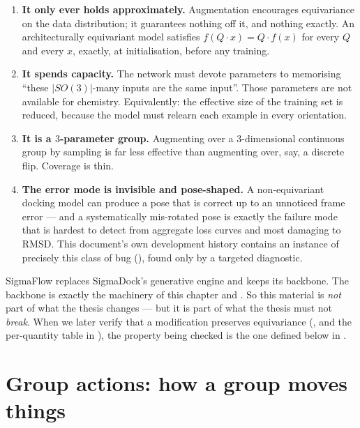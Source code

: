 \documentclass[11pt,a4paper]{report}
\theoremstyle{definition}
\theoremstyle{remark}
\begin{document}
\begin{enumerate}
\item \textbf{It only ever holds approximately.} Augmentation encourages
equivariance on the data distribution; it guarantees nothing off it, and
nothing exactly. An architecturally equivariant model satisfies
$f(Q\cdot x)=Q\cdot f(x)$ for every $Q$ and every $x$, exactly, at
initialisation, before any training.
\item \textbf{It spends capacity.} The network must devote parameters to
memorising ``these $|SO(3)|$-many inputs are the same input''. Those
parameters are not available for chemistry. Equivalently: the effective
size of the training set is reduced, because the model must relearn each
example in every orientation.
\item \textbf{It is a $3$-parameter group.} Augmenting over a
$3$-dimensional continuous group by sampling is far less effective than
augmenting over, say, a discrete flip. Coverage is thin.
\item \textbf{The error mode is invisible and pose-shaped.} A
non-equivariant docking model can produce a pose that is correct up to an
unnoticed frame error --- and a systematically mis-rotated pose is exactly
the failure mode that is hardest to detect from aggregate loss curves and
most damaging to RMSD. This document's own development history contains an
instance of precisely this class of bug (),
found only by a targeted diagnostic.
\end{enumerate}

\begin{tcolorbox}[colback=blue!3,colframe=blue!40!black,title=Why this matters for SigmaFlow]
SigmaFlow replaces SigmaDock's generative engine and keeps its backbone.
The backbone is exactly the machinery of this chapter and
. So this material is \emph{not} part of what the
thesis changes --- but it is part of what the thesis must not
\emph{break}. When we later verify that a modification preserves
equivariance (, and the per-quantity table in
), the property being
checked is the one defined below in .
\end{tcolorbox}

\section{Group actions: how a group moves things}
\label{sec:group-actions}
\end{document}
